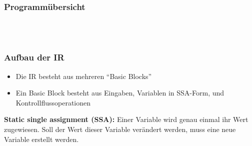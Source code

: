 \begin{frame}
    \frametitle{Programmübersicht}
    ~\\
    ~\\
\end{frame}

\begin{frame}
    \frametitle{Aufbau der IR}

    \begin{itemize}
        \item Die IR besteht aus mehreren "`Basic Blocks"'
        \item Ein Basic Block besteht aus Eingaben, Variablen in SSA-Form, und Kontrollflussoperationen
    \end{itemize}

    \textbf{Static single assignment (SSA):} Einer Variable wird genau einmal ihr Wert zugewiesen.
    Soll der Wert dieser Variable verändert werden, muss eine neue Variable erstellt werden.
\end{frame}


